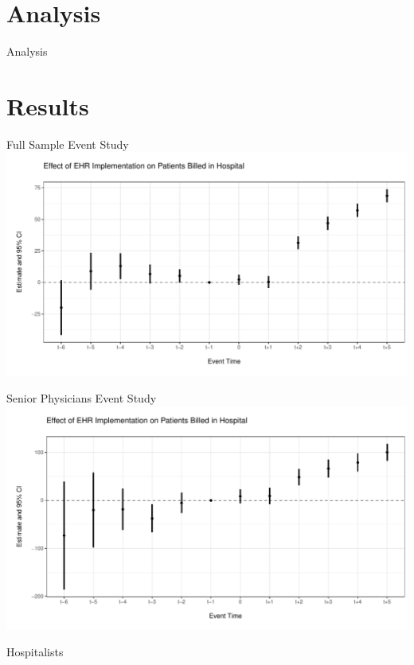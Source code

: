\documentclass[10pt]{beamer}
\begin{document}
\section{Analysis}

\begin{frame}{Analysis}


    
\end{frame}

\section{Results}

\begin{frame}{Full Sample Event Study}
\centering
\includegraphics[scale=.45]{Objects/event_fullsample.pdf}
\end{frame}

\begin{frame}{Senior Physicians Event Study}
\centering
\includegraphics[scale=.45]{Objects/event_oldsample.pdf}
\end{frame}

\begin{frame}{Hospitalists}
    
\end{frame}
\end{document}
